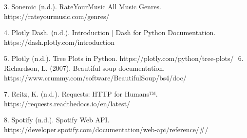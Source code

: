 \documentclass[fontsize=11pt]{article}
\begin{document}
3. Sonemic (n.d.). RateYourMusic All Music Genres. https://rateyourmusic.com/genres/  \newline 

4. Plotly Dash. (n.d.). Introduction | Dash for Python Documentation. https://dash.plotly.com/introduction \newline  
  
5. Plotly (n.d.). Tree Plots in Python. https://plotly.com/python/tree-plots/ \newline  
‌  
6‌. Richardson, L. (2007). Beautiful soup documentation. https://www.crummy.com/software/BeautifulSoup/bs4/doc/ \newline  
  
7. Reitz, K. (n.d.). Requests: HTTP for Humans™. https://requests.readthedocs.io/en/latest/ \newline  
  
8. Spotify (n.d.). Spotify Web API. https://developer.spotify.com/documentation/web-api/reference/\#/ \newline  
  
  
\end{document}
